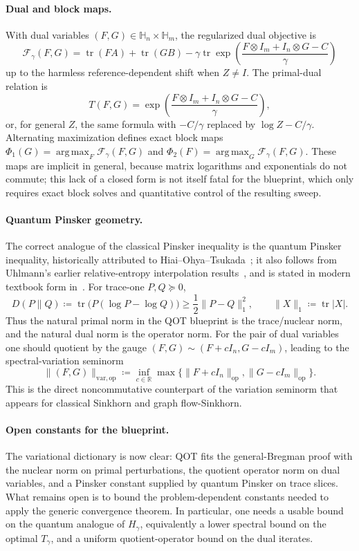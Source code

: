 \documentclass{article}
\newcommand{\argmax}{\mathop{\mathrm{arg\,max}}}
\theoremstyle{plain}
\newcommand{\eqdef}{\coloneqq}
\newcommand{\RR}{\mathbb{R}}
\begin{document}
\paragraph{Dual and block maps.}
With dual variables $(F,G)\in\mathbb{H}_n\times\mathbb{H}_m$, the regularized dual objective is
\[
\mathcal F_\gamma(F,G)
=
\operatorname{tr}(FA)+\operatorname{tr}(GB)
-
\gamma\operatorname{tr}
\exp\!\left(
\frac{F\otimes I_m+I_n\otimes G-C}{\gamma}
\right)
\]
up to the harmless reference-dependent shift when $Z\ne I$. The primal-dual relation is
\[
T(F,G)
=
\exp\!\left(
\frac{F\otimes I_m+I_n\otimes G-C}{\gamma}
\right),
\]
or, for general $Z$, the same formula with $-C/\gamma$ replaced by $\log Z-C/\gamma$. Alternating maximization defines exact block maps $\Phi_1(G)=\argmax_F\mathcal F_\gamma(F,G)$ and $\Phi_2(F)=\argmax_G\mathcal F_\gamma(F,G)$. These maps are implicit in general, because matrix logarithms and exponentials do not commute; this lack of a closed form is not itself fatal for the blueprint, which only requires exact block solves and quantitative control of the resulting sweep.

\paragraph{Quantum Pinsker geometry.}
The correct analogue of the classical Pinsker inequality is the quantum Pinsker inequality, historically attributed to Hiai--Ohya--Tsukada~\citep{hiai1981sufficiency}; it also follows from Uhlmann's earlier relative-entropy interpolation results~\citep{uhlmann1977relative}, and is stated in modern textbook form in~\citep{watrous2018theory}. For trace-one $P,Q\succeq0$,
\[
D(P\|Q)
\eqdef
\operatorname{tr}\bigl(P(\log P-\log Q)\bigr)
\ge
\frac12\|P-Q\|_1^2,
\qquad
\|X\|_1\eqdef\operatorname{tr}|X|.
\]
Thus the natural primal norm in the QOT blueprint is the trace/nuclear norm, and the natural dual norm is the operator norm. For the pair of dual variables one should quotient by the gauge $(F,G)\sim(F+cI_n,G-cI_m)$, leading to the spectral-variation seminorm
\[
\|(F,G)\|_{\mathrm{var},\mathrm{op}}
\eqdef
\inf_{c\in\RR}
\max\{\|F+cI_n\|_{\mathrm{op}},\|G-cI_m\|_{\mathrm{op}}\}.
\]
This is the direct noncommutative counterpart of the variation seminorm that appears for classical Sinkhorn and graph flow-Sinkhorn.

\paragraph{Open constants for the blueprint.}
The variational dictionary is now clear: QOT fits the general-Bregman proof with the nuclear norm on primal perturbations, the quotient operator norm on dual variables, and a Pinsker constant supplied by quantum Pinsker on trace slices. What remains open is to bound the problem-dependent constants needed to apply the generic convergence theorem. In particular, one needs a usable bound on the quantum analogue of $H_\gamma$, equivalently a lower spectral bound on the optimal $T_\gamma$, and a uniform quotient-operator bound on the dual iterates.
\end{document}
